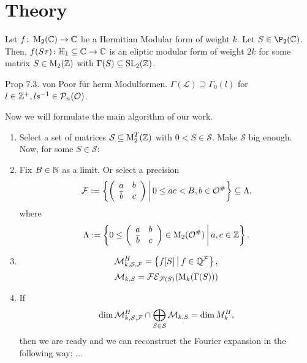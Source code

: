 
\section{Theory}


\begin{lemma}
Let $f \colon \operatorname{M}_2(\mathbb{C}) \rightarrow \mathbb{C}$ be a Hermitian Modular form of weight $k$. Let $S \in \P_2(\C)$.
Then, $f(S \tau) \colon \mathbb{H}_1 \subseteq \mathbb{C} \rightarrow \mathbb{C}$ is an eliptic modular form of weight $2k$ for some matrix $S \in \operatorname{M}_2(\mathbb{Z})$ with $\Gamma(S) \subseteq \operatorname{SL}_2(\mathbb{Z})$.
\end{lemma}


\begin{lemma}
Prop 7.3. von Poor für herm Modulformen.
$\Gamma(\mathcal{L}) \supseteq \Gamma_0(l)$ for $l \in \mathbb{Z}^+, ls^{-1} \in \mathcal{P}_n(\mathcal{O})$.
\end{lemma}


Now we will formulate the main algorithm of our work.

\begin{algo}
\begin{enumerate}
\item Select a set of matrices $\mathcal{S} \subseteq \operatorname{M}_2^T(\mathbb{Z})$ with $0 < S \in \mathcal{S}$. Make $\mathcal{S}$ big enough. Now, for some $S \in \mathcal{S}$:

\item Fix $B \in \mathbb{N}$ as a limit. Or select a precision
\[ \F := \Set{\SimpleMatrix{a}{b}{\overline b}{c}}{0 \le a c < B, b \in \curlO^\#} \subseteq \Lambda , \]
where
\[ \Lambda := \Set{0 \le \SimpleMatrix{a}{b}{\overline b}{c} \in \M_2(\curlO^\#)}{a,c \in \Z } . \]

\item
\[ \mathcal{M}_{k,\mathcal{S},\F}^H = \Set{f [S]}{f \in \Q^\F} , \]
\[ \mathcal{M}_{k,S} = \mathcal{FE}_{\mathcal{F}(S)}(\operatorname{M}_k(\Gamma(S))) \]

\item
If
\[ \dim \mathcal{M}_{k,\mathcal{S},\mathcal{F}}^H \cap \bigoplus_{S \in \mathcal{S}} \mathcal{M}_{k,S}
= \dim M^H_k , \]
then we are ready and we can reconstruct the Fourier expansion in the following way: ...

\end{enumerate}
\end{algo}

